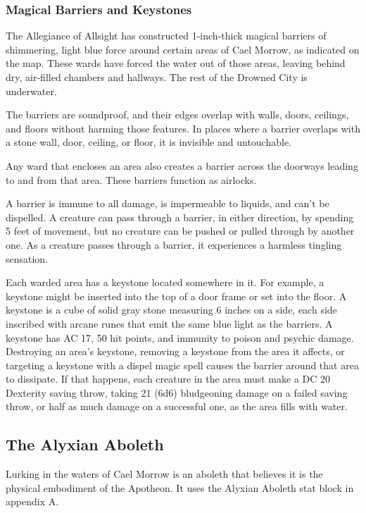 \documentclass[10pt,a4paper,twoside,twocolumn,openany,nodeprecatedcode]{dndbook}
\begin{document}
\subsubsection{Magical Barriers and Keystones}
The Allegiance of Allsight has constructed 1-inch-thick magical barriers of shimmering, light blue force around certain areas of Cael Morrow, as indicated on the map. These wards have forced the water out of those areas, leaving behind dry, air-filled chambers and hallways. The rest of the Drowned City is underwater.

The barriers are soundproof, and their edges overlap with walls, doors, ceilings, and floors without harming those features. In places where a barrier overlaps with a stone wall, door, ceiling, or floor, it is invisible and untouchable.

Any ward that encloses an area also creates a barrier across the doorways leading to and from that area. These barriers function as airlocks.

A barrier is immune to all damage, is impermeable to liquids, and can't be dispelled. A creature can pass through a barrier, in either direction, by spending 5 feet of movement, but no creature can be pushed or pulled through by another one. As a creature passes through a barrier, it experiences a harmless tingling sensation.

Each warded area has a keystone located somewhere in it. For example, a keystone might be inserted into the top of a door frame or set into the floor. A keystone is a cube of solid gray stone measuring 6 inches on a side, each side inscribed with arcane runes that emit the same blue light as the barriers. A keystone has AC 17, 50 hit points, and immunity to poison and psychic damage. Destroying an area's keystone, removing a keystone from the area it affects, or targeting a keystone with a dispel magic spell causes the barrier around that area to dissipate. If that happens, each creature in the area must make a DC 20 Dexterity saving throw, taking 21 (6d6) bludgeoning damage on a failed saving throw, or half as much damage on a successful one, as the area fills with water.

\subsection{The Alyxian Aboleth}
Lurking in the waters of Cael Morrow is an aboleth that believes it is the physical embodiment of the Apotheon. It uses the Alyxian Aboleth stat block in appendix A.
\end{document}
